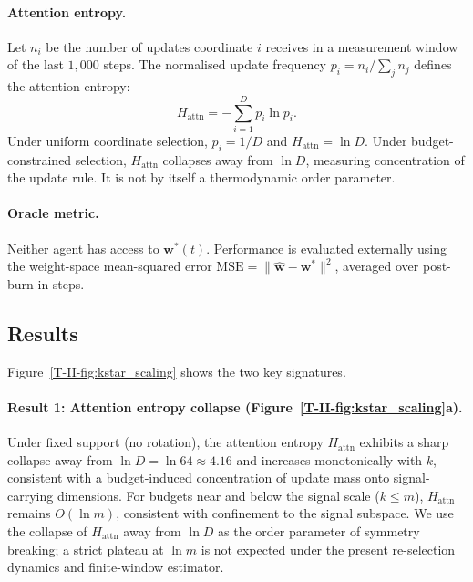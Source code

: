 \documentclass[12pt,a4paper,openany]{book}
\begin{document}
\paragraph{Attention entropy.}
Let $n_i$ be the number of updates coordinate $i$ receives
in a measurement window of the last $1{,}000$ steps.
The normalised update frequency
$p_i = n_i / \sum_j n_j$ defines the attention entropy:
\begin{equation}
\label{T-II-eq:H_attn}
H_{\mathrm{attn}} = -\sum_{i=1}^{D} p_i \ln p_i.
\end{equation}
Under uniform coordinate selection, $p_i = 1/D$ and
$H_{\mathrm{attn}} = \ln D$.  Under budget-constrained
selection, $H_{\mathrm{attn}}$ collapses away from $\ln D$,
measuring concentration of the update rule.  It is not by itself a
thermodynamic order parameter.

\paragraph{Oracle metric.}
Neither agent has access to $\mathbf{w}^*(t)$.
Performance is evaluated externally using the
weight-space mean-squared error
$\mathrm{MSE} = \|\hat{\mathbf{w}} - \mathbf{w}^*\|^2$,
averaged over post-burn-in steps.

\subsection{Results}
\label{T-II-subsec:demo_results}

Figure~\ref{T-II-fig:kstar_scaling} shows the two key signatures.

\paragraph{Result 1: Attention entropy collapse
(Figure~\ref{T-II-fig:kstar_scaling}a).}
Under fixed support (no rotation), the attention entropy
$H_{\mathrm{attn}}$ exhibits a sharp collapse away from
$\ln D = \ln 64 \approx 4.16$ and increases monotonically
with $k$, consistent with a budget-induced concentration
of update mass onto signal-carrying dimensions.
For budgets near and below the signal scale ($k \leq m$),
$H_{\mathrm{attn}}$ remains $O(\ln m)$, consistent with
confinement to the signal subspace.
We use the collapse of $H_{\mathrm{attn}}$ away from
$\ln D$ as the order parameter of symmetry breaking;
a strict plateau at $\ln m$ is not expected under the
present re-selection dynamics and finite-window estimator.
\end{document}
